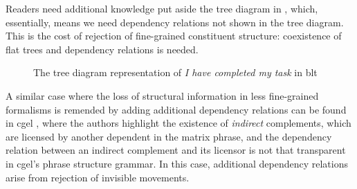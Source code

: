 \documentclass[../main.tex]{subfiles}
\begin{document}
Readers need additional knowledge put aside 
the tree diagram in , which, essentially, 
means we need dependency relations not shown in the tree diagram.
This is the cost of rejection of fine-grained constituent structure: 
coexistence of flat trees and dependency relations is needed.

\begin{figure}
    \centering
    
    \caption{The tree diagram representation of \emph{I have completed my task} in \ac{blt}}
    \label{fig:complete-my-task-blt-1}
\end{figure}

A similar case where the loss of structural information in less fine-grained formalisms
is remended by adding additional dependency relations can be found in \ac{cgel} , 
where the authors highlight the existence of \emph{indirect} complements, 
which are licensed by another dependent in the matrix phrase, 
and the dependency relation between an indirect complement and its licensor is not that 
transparent in \ac{cgel}'s phrase structure grammar.
In this case, additional dependency relations arise from rejection of invisible movements.
\end{document}
